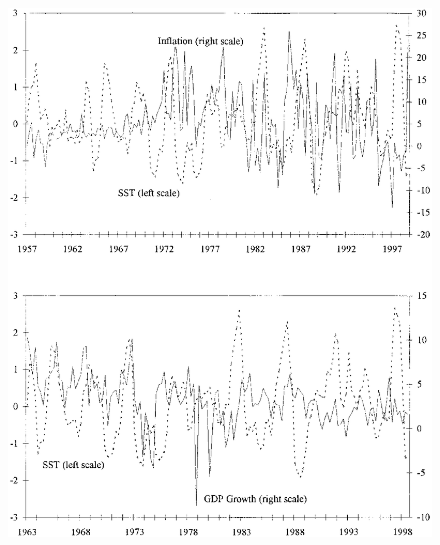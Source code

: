 \documentclass{beamer}
\begin{document}
\begin{frame}
  \begin{figure}
    \includegraphics[scale=.2]{brunner2.eps}
  \end{figure}
\end{frame}
\end{document}

